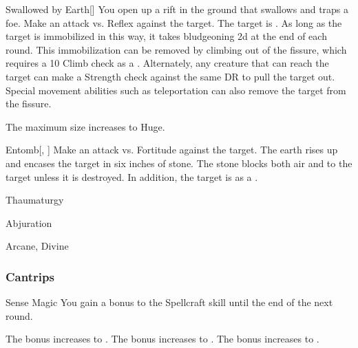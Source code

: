 \lowercase{\hypertarget{spell:Swallowed by Earth}{}}\label{spell:Swallowed by Earth}
\begin{freeability}[Rank 6]{\hypertarget{spell:Swallowed by Earth}{Swallowed by Earth}}[]
You open up a rift in the ground that swallows and traps a foe.
Make an attack vs. Reflex against the target.
\hit The target is .
As long as the target is immobilized in this way,
it takes bludgeoning  \minus2d at the end of each round.
This immobilization can be removed by climbing out of the fissure, which requires a  10 Climb check as a .
Alternately, any creature that can reach the target can make a Strength check against the same DR to pull the target out.
Special movement abilities such as teleportation can also remove the target from the fissure.

\rankline
{} The maximum size increases to Huge.
\end{freeability}
\vspace{0.25em}



\lowercase{\hypertarget{spell:Entomb}{}}\label{spell:Entomb}
\begin{freeability}[Rank 8]{\hypertarget{spell:Entomb}{Entomb}}[, ]
Make an attack vs. Fortitude against the target.
\hit The earth rises up and encases the target in six inches of stone.
The stone blocks both air and  to the target unless it is destroyed.
In addition, the target is  as a .
\end{freeability}
\vspace{0.25em}


\newpage
\begin{spellsection}{Thaumaturgy}

\begin{spellheader}
\end{spellheader}


 Abjuration

 Arcane, Divine

\subsubsection{Cantrips}


\begin{freeability}{Sense Magic}
You gain a  bonus to the Spellcraft skill until the end of the next round.

\rankline
{} The bonus increases to .
 The bonus increases to .
 The bonus increases to .
\end{freeability}

\end{spellsection}


